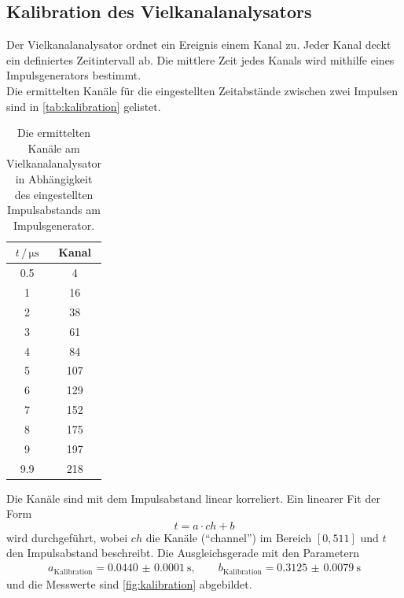 \subsection{Kalibration des Vielkanalanalysators}
Der Vielkanalanalysator ordnet ein Ereignis einem Kanal zu.
Jeder Kanal deckt ein definiertes Zeitintervall ab.
Die mittlere Zeit jedes Kanals wird mithilfe eines Impulsgenerators bestimmt.
\\
Die ermittelten Kanäle für die eingestellten Zeitabstände zwischen zwei Impulsen sind in \autoref{tab:kalibration} gelistet.
\begin{table}
    \centering
    \caption{Die ermittelten Kanäle am Vielkanalanalysator in Abhängigkeit des eingestellten Impulsabstands am Impulsgenerator.}
    \label{tab:kalibration}
    \begin{tabular}{cc}
        \toprule
        $t \,/\, \unit{\micro\second}$ & Kanal \\
        \midrule
        0.5 & 4 \\
        1 & 16 \\
        2 & 38 \\
        3 & 61 \\
        4 & 84 \\
        5 & 107 \\
        6 & 129 \\
        7 & 152 \\
        8 & 175 \\
        9 & 197 \\
        9.9 & 218 \\
        \bottomrule
    \end{tabular}
\end{table}
Die Kanäle sind mit dem Impulsabstand linear korreliert.
Ein linearer Fit der Form
\begin{equation}
    t = a \cdot ch + b
    \label{eqn:fit_kanal}
\end{equation}
wird durchgeführt, wobei $ch$ die Kanäle ("`channel"') im Bereich $[0, 511]$ und $t$ den Impulsabstand beschreibt.
Die Ausgleichsgerade mit den Parametern
\begin{align*}
    a_\text{Kalibration} = \qty{0.0440(00001)}{\second}, \qquad b_\text{Kalibration} = \qty{0.3125(00079)}{\second}
\end{align*}
und die Messwerte sind \autoref{fig:kalibration} abgebildet.
